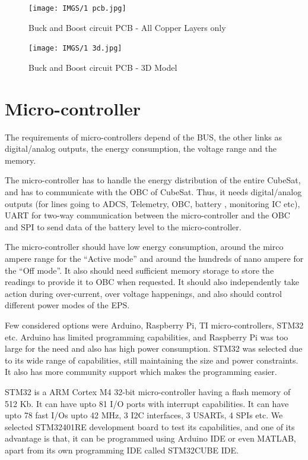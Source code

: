 
\begin{figure}[!ht]
	\centering
	\texttt{[image: IMGS/1 pcb.jpg]}
	\caption{\centering Buck and Boost circuit PCB - All Copper Layers only}
	\label{fig:bubopcb}
\end{figure}

\begin{figure}[H]
	\centering
	\texttt{[image: IMGS/1 3d.jpg]}
	\caption{\centering Buck and Boost circuit PCB - 3D Model}
	\label{fig:bubopcb3d}
\end{figure}


 
 \section{Micro-controller}
 The requirements of micro-controllers depend of the BUS, the other links as digital/analog outputs, the energy consumption, the voltage range and the memory.
 \par
 The micro-controller has to handle the energy distribution of the entire CubeSat, and has to communicate with the OBC of CubeSat. Thus, it needs digital/analog outputs (for lines going to ADCS, Telemetry, OBC, battery , monitoring IC etc), UART for two-way communication between the micro-controller and the OBC and SPI to  send data of the battery level to the micro-controller.
 \par
 The micro-controller should have low energy consumption, around the mirco ampere range for the “Active mode” and around the hundreds of nano ampere for the “Off mode”. It also should need sufficient memory storage to store the readings to provide it to OBC when requested. It should also independently take action during over-current, over voltage happenings, and also should control different power modes of the EPS.
 \par
 Few considered options were Arduino, Raspberry Pi, TI micro-controllers, STM32 etc. Arduino has limited programming capabilities, and Raspberry Pi was too large for the need and also has high power consumption. STM32 was selected due to its wide range of capabilities, still maintaining the size and power constraints. It also has more community support which makes the programming easier.
 \par
 STM32 is a ARM Cortex M4 32-bit micro-controller having a flash memory of 512 Kb. It can have upto 81 I/O ports with interrupt capabilities. It can have upto 78 fast I/Os upto 42 MHz, 3 I2C interfaces, 3 USARTs, 4 SPIs etc. We selected STM32401RE development board to test its capabilities, and one of its advantage is that, it can be programmed using Arduino IDE or even MATLAB, apart from its own programming IDE called STM32CUBE IDE.

